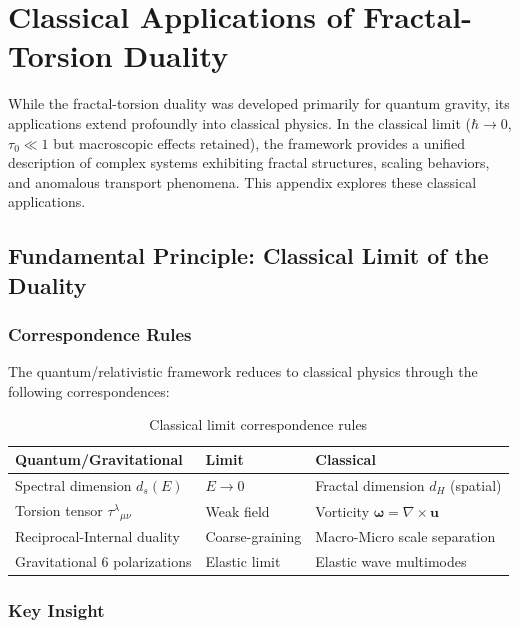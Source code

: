 \section{Classical Applications of Fractal-Torsion Duality}
\label{app:classical_applications}

While the fractal-torsion duality was developed primarily for quantum gravity, its applications extend profoundly into classical physics. In the classical limit ($\hbar \to 0$, $\tau_0 \ll 1$ but macroscopic effects retained), the framework provides a unified description of complex systems exhibiting fractal structures, scaling behaviors, and anomalous transport phenomena. This appendix explores these classical applications.

\subsection{Fundamental Principle: Classical Limit of the Duality}

\subsubsection{Correspondence Rules}

The quantum/relativistic framework reduces to classical physics through the following correspondences:

\begin{table}[h]
\centering
\begin{tabular}{p{4cm}p{2cm}p{5cm}}
\toprule
\textbf{Quantum/Gravitational} & \textbf{Limit} & \textbf{Classical} \\
\midrule
Spectral dimension $d_s(E)$ & $E \to 0$ & Fractal dimension $d_H$ (spatial) \\
Torsion tensor $\tau^\lambda{}_{\mu\nu}$ & Weak field & Vorticity $\boldsymbol{\omega} = \nabla \times \mathbf{u}$ \\
Reciprocal-Internal duality & Coarse-graining & Macro-Micro scale separation \\
Gravitational 6 polarizations & Elastic limit & Elastic wave multimodes \\
\bottomrule
\end{tabular}
\caption{Classical limit correspondence rules}
\end{table}

\subsubsection{Key Insight}

